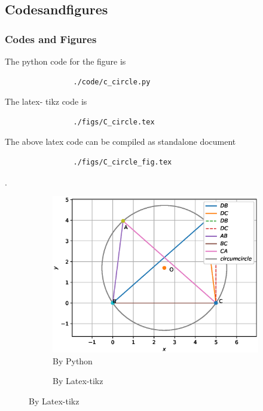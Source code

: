 \documentclass{beamer}
\begin{document}
	\subsection*{Codesandfigures}
	\begin{frame}[fragile]
		\frametitle{Codes and Figures}
		\tiny
		\begin{flushleft}
		The python code for the figure is
			\begin{lstlisting}
				./code/c_circle.py
			\end{lstlisting}
		The latex- tikz code is
			\begin{lstlisting}
				./figs/C_circle.tex
			\end{lstlisting}
		The above latex code can be compiled as standalone document
			\begin{lstlisting} 
				./figs/C_circle_fig.tex
			\end{lstlisting}
		\end{flushleft}.
		\begin{figure}
			\begin{minipage}{0.45\linewidth}
			\begin{subfigure}{0.5\textwidth}
			\begin{flushleft}
				\includegraphics[scale=0.3]{./figures/c_circle.eps}
				\caption{\tiny By Python}
			\end{flushleft}
			\end{subfigure}
			\end{minipage}
			\hfill
			\begin{minipage}{0.45\linewidth}
			\begin{subfigure}{0.5\textwidth}
			\begin{flushright}
				\resizebox{1.3\columnwidth}{!}{}
				\caption{\tiny By Latex-tikz}
			\end{flushright}
			\end{subfigure}
			\end{minipage}
			\end{figure}
		\end{frame}
	
\end{document}
